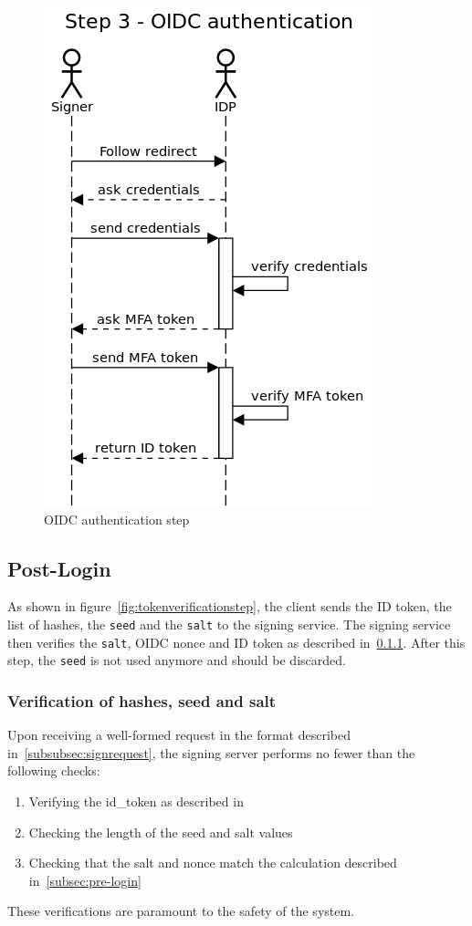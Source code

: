 \begin{figure}
    \begin{center}
        \includegraphics[scale=0.5]{images/protocol_step3_oidc_authentication.png}
        \caption{OIDC authentication step}
        \label{fig:oidcauthenticationstep}
    \end{center}
\end{figure}

\subsection{Post-Login}\label{subsec:post-login}
As shown in figure~\ref{fig:tokenverificationstep},
the client sends the ID token, the list of hashes, the \texttt{seed} and the \texttt{salt} to the signing service.
The signing service then verifies the \texttt{salt}, OIDC nonce and ID token as described in~\ref{subsubsec:verificationhashesseedsalt}.
After this step, the \texttt{seed} is not used anymore and should be discarded.


\subsubsection{Verification of hashes, seed and salt}\label{subsubsec:verificationhashesseedsalt}
Upon receiving a well-formed request in the format described in~\ref{subsubsec:signrequest},
the signing server performs no fewer than the following checks:
\begin{enumerate}
    \item Verifying the id\_token as described in~\cite[Section~7.2]{rfc7519}
    \item Checking the length of the seed and salt values
    \item Checking that the salt and nonce match the calculation described in~\ref{subsec:pre-login}
\end{enumerate}
These verifications are paramount to the safety of the system.

